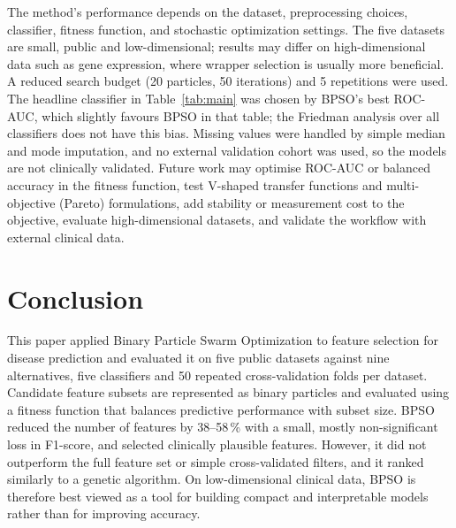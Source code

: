\documentclass[conference]{IEEEtran}
\begin{document}
The method's performance depends on the dataset, preprocessing choices,
classifier, fitness function, and stochastic optimization settings. The five
datasets are small, public and low-dimensional; results may differ on
high-dimensional data such as gene expression, where wrapper selection is
usually more beneficial. A reduced search budget (20 particles, 50 iterations)
and 5 repetitions were used. The headline classifier in Table~\ref{tab:main}
was chosen by BPSO's best ROC-AUC, which slightly favours BPSO in that table;
the Friedman analysis over all classifiers does not have this bias. Missing
values were handled by simple median and mode imputation, and no external
validation cohort was used, so the models are not clinically validated.
Future work may optimise ROC-AUC or balanced accuracy in the fitness function,
test V-shaped transfer functions and multi-objective (Pareto) formulations,
add stability or measurement cost to the objective, evaluate high-dimensional
datasets, and validate the workflow with external clinical data.

\section{Conclusion}

This paper applied Binary Particle Swarm Optimization to feature selection
for disease prediction and evaluated it on five public datasets against nine
alternatives, five classifiers and 50 repeated cross-validation folds per
dataset. Candidate feature subsets are represented as binary particles and
evaluated using a fitness function that balances predictive performance with
subset size. BPSO reduced the number of features by 38--58\,\% with a small,
mostly non-significant loss in F1-score, and selected clinically plausible
features. However, it did not outperform the full feature set or simple
cross-validated filters, and it ranked similarly to a genetic algorithm. On
low-dimensional clinical data, BPSO is therefore best viewed as a tool for
building compact and interpretable models rather than for improving accuracy.
\end{document}
